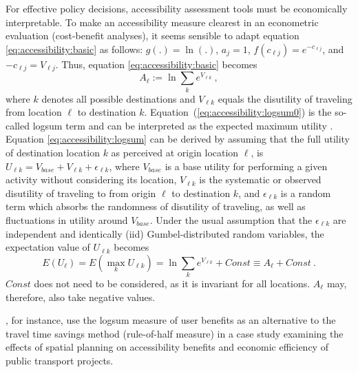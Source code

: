 For effective policy decisions, accessibility assessment tools must be economically interpretable.
To make an accessibility measure clearest in an econometric evaluation (\eg cost-benefit 
analyses), it seems sensible to adapt equation \ref{eq:accessibility:basic} as 
follows: $g(.) = \ln(.)$, $a_j = 1$, $f(c_{\ell j}) = e^{-c_{\ell j}}$, and $-c_{\ell j} = V_{\ell j}$. Thus, 
equation \ref{eq:accessibility:basic} becomes
\begin{equation}
	A_\ell := \ln \sum_k e^{V_{\ell k}} \ ,
	\label{eq:accessibility:logsum}
\end{equation}
where $k$ denotes all possible destinations and $V_{\ell k}$ equals the disutility of traveling from location $\ell$
to destination $k$. Equation~(\ref{eq:accessibility:logsum0}) is the so-called \gls{logsum} term and can be interpreted
as the expected maximum utility \citep[e.g.,][]{Ben-AkivaBook, DejongEtc2005LogsumAsEvalDutchReport}. Equation
\ref{eq:accessibility:logsum} can be derived by assuming that the full utility of destination location $k$ as
perceived at origin location $\ell$, is $U_{\ell k} = V_{base} + V_{\ell k} + \epsilon_{\ell k}$,
where $V_{base}$ is a base utility for performing a given activity without considering its location,
$V_{\ell k}$ is the systematic or observed disutility of traveling to from origin $\ell$ to destination $k$,
and $\epsilon_{\ell k}$ is a random term which absorbs the randomness of disutility of traveling, as well as
fluctuations in utility around $V_{base}$. Under the usual assumption that the $\epsilon_{\ell k}$ are
independent and identically (iid) Gumbel-distributed random variables, the expectation value of $U_{\ell k}$ becomes
\begin{equation}
	E(U_\ell) = E(\max_k U_{\ell k}) = \ln \sum_k e^{V_{\ell k}} + Const \equiv A_\ell + Const \ .
\end{equation}
$Const$ does not need to be considered, as it is invariant for all locations. $A_\ell$ may, therefore, also
take negative values.

\citet{GeursEtAl2012AccessibilityBenefitsNetherlands}, for instance, use the \gls{logsum} measure of user benefits 
as an alternative to the travel time savings method (\ie rule-of-half measure) in a case study 
examining the effects of spatial planning on accessibility benefits and economic efficiency of public 
transport projects.

